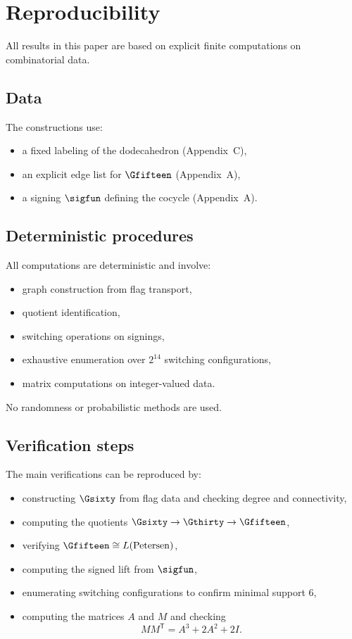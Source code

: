 \section{Reproducibility}

All results in this paper are based on explicit finite computations on
combinatorial data.

\subsection{Data}

The constructions use:
\begin{itemize}
\item a fixed labeling of the dodecahedron (Appendix~C),
\item an explicit edge list for $\Gfifteen$ (Appendix~A),
\item a signing $\sigfun$ defining the cocycle (Appendix~A).
\end{itemize}

\subsection{Deterministic procedures}

All computations are deterministic and involve:
\begin{itemize}
\item graph construction from flag transport,
\item quotient identification,
\item switching operations on signings,
\item exhaustive enumeration over $2^{14}$ switching configurations,
\item matrix computations on integer-valued data.
\end{itemize}

No randomness or probabilistic methods are used.

\subsection{Verification steps}

The main verifications can be reproduced by:
\begin{itemize}
\item constructing $\Gsixty$ from flag data and checking degree and connectivity,
\item computing the quotients $\Gsixty \to \Gthirty \to \Gfifteen$,
\item verifying $\Gfifteen \cong L(\mathrm{Petersen})$,
\item computing the signed lift from $\sigfun$,
\item enumerating switching configurations to confirm minimal support $6$,
\item computing the matrices $A$ and $M$ and checking
\[
MM^{\mathsf T} = A^3 + 2A^2 + 2I.
\]
\end{itemize}

